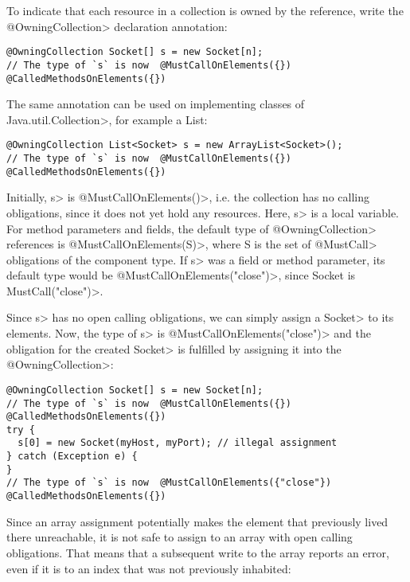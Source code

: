 
To indicate that each resource in a collection is owned by the reference, write the \<@OwningCollection> declaration annotation:

\begin{Verbatim}
@OwningCollection Socket[] s = new Socket[n];
// The type of `s` is now  @MustCallOnElements({}) @CalledMethodsOnElements({})
\end{Verbatim}

The same annotation can be used on implementing classes of \<Java.util.Collection>, for example a List:
\begin{Verbatim}
@OwningCollection List<Socket> s = new ArrayList<Socket>();
// The type of `s` is now  @MustCallOnElements({}) @CalledMethodsOnElements({})
\end{Verbatim}

Initially, \<s> is \<@MustCallOnElements({})>, i.e. the collection has no calling obligations, since it does not yet hold any resources. Here, \<s> is a local variable. For method parameters and fields, the default type of \<@OwningCollection> references is \<@MustCallOnElements(S)>, where S is the set of \<@MustCall> obligations of the component type. If \<s> was a field or method parameter, its default type would be \<@MustCallOnElements({"close"})>, since Socket is \<MustCall("close")>.

Since \<s> has no open calling obligations, we can simply assign a \<Socket> to its elements. Now, the type of \<s> is \<@MustCallOnElements({"close"})> and the obligation for the created \<Socket> is fulfilled by assigning it into the \<@OwningCollection>:

\begin{verbatim}
@OwningCollection Socket[] s = new Socket[n];
// The type of `s` is now  @MustCallOnElements({}) @CalledMethodsOnElements({})
try {
  s[0] = new Socket(myHost, myPort); // illegal assignment
} catch (Exception e) {
}
// The type of `s` is now  @MustCallOnElements({"close"}) @CalledMethodsOnElements({})
\end{verbatim}

Since an array assignment potentially makes the element that previously lived there unreachable, it is not safe to assign to an array with open calling obligations. That means that a subsequent write to the array reports an error, even if it is to an index that was not previously inhabited:

